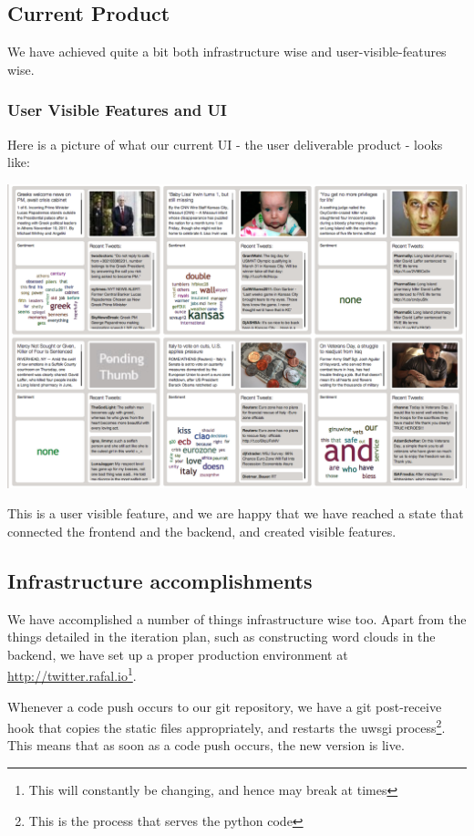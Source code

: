 \documentclass[a4paper,12pt]{article}
\begin{document}
	\subsection{Current Product}
	
	We have achieved quite a bit both infrastructure wise and user-visible-features wise.
	
	\subsubsection{User Visible Features and UI}
	
	Here is a picture of what our current UI - the user deliverable product - looks like:
	
	\includegraphics[scale=0.36]{website.png}
	
	This is a user visible feature, and we are happy that we have reached a state that connected the frontend and the backend, and created visible features.
	
	\subsection{Infrastructure accomplishments}
	
	We have accomplished a number of things infrastructure wise too. Apart from the things detailed in the iteration plan, such as constructing word clouds in the backend, we have set up a proper production environment at \url{http://twitter.rafal.io}\footnote{This will constantly be changing, and hence may break at times}.
	
	Whenever a code push occurs to our git repository, we have a git post-receive hook that copies the static files appropriately, and restarts the uwsgi process\footnote{This is the process that serves the python code}. This means that as soon as a code push occurs, the new version is live.
 
\end{document}

